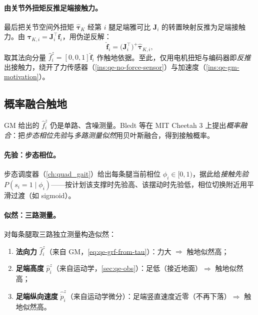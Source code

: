 \paragraph{由关节外扭矩反推足端接触力。}
最后把关节空间外扭矩 $\hat{\boldsymbol\tau}_K$ 经第 $i$ 腿足端雅可比 $\mathbf{J}_i$ 的转置映射反推为足端接触力。由 $\boldsymbol\tau_{K,i}=\mathbf{J}_i^\top\boldsymbol f_i$，用伪逆反解：
\begin{equation}
  \hat{\boldsymbol f}_i = \big(\mathbf{J}_i^\top\big)^{+}\hat{\boldsymbol\tau}_{K,i},
  \label{eq:qe-grf-from-tau}
\end{equation}
取其法向分量 $\hat f_i^z=[0,0,1]\hat{\boldsymbol f}_i$ 作触地依据。至此，仅用电机扭矩与编码器即\emph{反推}出接触力，绕开了力传感器（\cref{ins:qe-no-force-sensor}）与加速度（\cref{ins:qe-gm-motivation}）。

\subsection{概率融合触地}
\label{subsec:qe-prob}

GM 给出的 $\hat f_i^z$ 仍是单路、含噪测量。Bledt 等在 MIT Cheetah 3 上提出\emph{概率融合}：把\emph{步态相位先验}与\emph{多路测量似然}用贝叶斯融合，得到接触概率\cite{bledt2018contact}。

\paragraph{先验：步态相位。}
步态调度器（\cref{ch:quad_gait}）给出每条腿当前相位 $\phi_i\in[0,1)$，据此给\emph{接触先验} $P(s_i=1\mid\phi_i)$——按计划该支撑时先验高、该摆动时先验低，相位切换附近用平滑过渡（如 sigmoid）。

\paragraph{似然：三路测量。}
对每条腿取三路独立测量构造似然：
\begin{enumerate}
  \item \textbf{法向力} $\hat f_i^z$（来自 GM，\cref{eq:qe-grf-from-tau}）：力大 $\Rightarrow$ 触地似然高；
  \item \textbf{足端高度} $\hat p_i^z$（来自运动学，\cref{sec:qe-obs}）：足低（接近地面）$\Rightarrow$ 触地似然高；
  \item \textbf{足端纵向速度} $\hat{\dot p}_i^z$（来自运动学微分）：足端竖直速度近零（不再下落）$\Rightarrow$ 触地似然高。
\end{enumerate}

